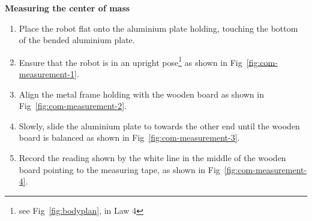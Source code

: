 \bigskip

{\bfseries Measuring the center of mass}

\headlinebox

\begin{enumerate}
\item Place the robot flat onto the aluminium plate holding,
  touching the bottom of the bended aluminium plate.
\item Ensure that the robot is in an upright pose\footnote{see
    Fig~\ref{fig:bodyplan}, in Law 4}
  as shown in Fig~\ref{fig:com-measurement-1}.
\item Align the metal frame holding with the wooden board as shown in
  Fig~\ref{fig:com-measurement-2}.
\item Slowly, slide the aluminium plate to towards the other end until the
  wooden board is balanced as shown in Fig~\ref{fig:com-measurement-3}.
\item Record the reading shown by the white line in the middle of the wooden
  board pointing to the measuring tape,
  as shown in Fig~\ref{fig:com-measurement-4}.
\end{enumerate}


